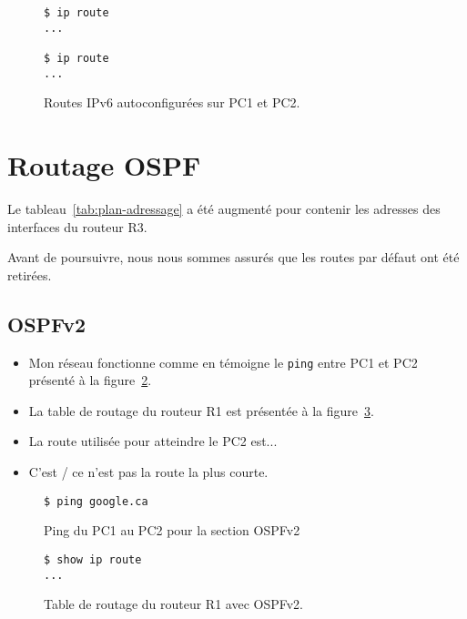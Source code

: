 \documentclass[]{article}
\begin{document}
\begin{figure} 
      \centering
      \begin{lstlisting}
$ ip route
...

$ ip route
...
      \end{lstlisting}
      \caption[]{Routes IPv6 autoconfigurées sur PC1 et PC2.}
      \label{fig:ipv6-routes-pc1-pc2}
\end{figure}

\section*{Routage OSPF}

Le tableau~\ref{tab:plan-adressage} a été augmenté pour contenir les adresses des interfaces
du routeur R3.

Avant de poursuivre, nous nous sommes assurés que les routes par défaut ont été retirées.

\subsection*{OSPFv2}

\begin{itemize}
      \item Mon réseau fonctionne comme en témoigne le \texttt{ping} entre PC1 et PC2
            présenté à la figure~\ref{fig:ping-pc1-pc2-ospfv2}.
      \item La table de routage du routeur R1 est présentée à la
            figure~\ref{fig:ospfv2-routes-r1}.
      \item La route utilisée pour atteindre le PC2 est...
      \item C'est / ce n'est pas la route la plus courte.
\end{itemize}

\begin{figure} 
      \centering
      \begin{lstlisting}
$ ping google.ca
      \end{lstlisting}
      \caption[]{Ping du PC1 au PC2 pour la section OSPFv2}
      \label{fig:ping-pc1-pc2-ospfv2}
\end{figure}

\begin{figure} 
      \centering
      \begin{lstlisting}
$ show ip route
...
      \end{lstlisting}
      \caption[]{Table de routage du routeur R1 avec OSPFv2.}
      \label{fig:ospfv2-routes-r1}
\end{figure}
\end{document}
